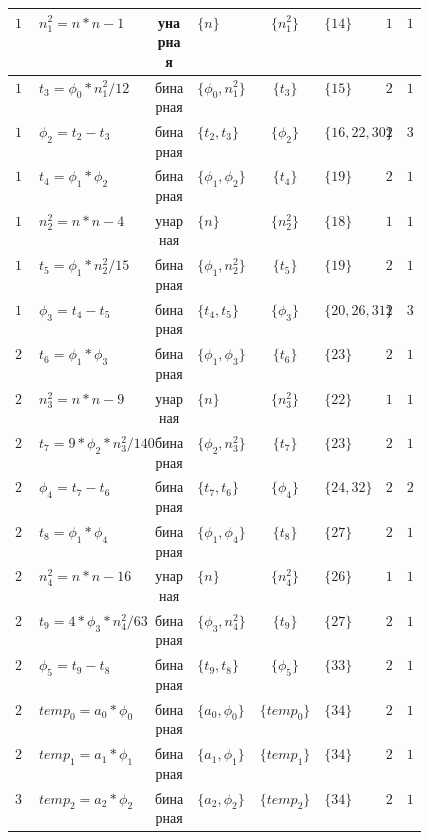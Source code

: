 \documentclass[a4paper,14pt]{article}
\begin{document}
\begin{tabular}{|c|p{0.16\linewidth}|c|p{0.14\linewidth}|c|p{0.1\linewidth}|p{0.05\linewidth}|p{0.025\linewidth}|}
$13$ &$n^2_{1} = n*n - 1$ &унарная &$\{n\}$ &$\{n^2_{1}\}$ &$\{14\}$ &$1$ &$1$ \\ \hline
$14$ &$t_{3} = \phi_{0} * n^2_{1} / 12$ &бинарная &$\{\phi_{0}, n^2_{1}\}$ &$\{t_{3}\}$ &$\{15\}$ &$2$ &$1$ \\ \hline
$15$ &$\phi_{2} = t_{2} - t_{3}$ &бинарная &$\{t_{2}, t_{3}\}$ &$\{\phi_{2}\}$ &$\{16, 22, 30\}$ &$2$ &$3$ \\ \hline
$16$ &$t_{4} = \phi_{1} * \phi_{2}$ &бинарная &$\{\phi_{1}, \phi_{2}\}$ &$\{t_{4}\}$ &$\{19\}$ &$2$ &$1$ \\ \hline
$17$ &$n^2_{2} = n*n - 4$ &унарная &$\{n\}$ &$\{n^2_{2}\}$ &$\{18\}$ &$1$ &$1$ \\ \hline
$18$ &$t_{5} = \phi_{1} * n^2_{2} / 15$ &бинарная &$\{\phi_{1}, n^2_{2}\}$ &$\{t_{5}\}$ &$\{19\}$ &$2$ &$1$ \\ \hline
$19$ &$\phi_{3} = t_{4} - t_{5}$ &бинарная &$\{t_{4}, t_{5}\}$ &$\{\phi_{3}\}$ &$\{20, 26, 31\}$ &$2$ &$3$ \\ \hline
$20$ &$t_{6} = \phi_{1} * \phi_{3}$ &бинарная &$\{\phi_{1}, \phi_{3}\}$ &$\{t_{6}\}$ &$\{23\}$ &$2$ &$1$ \\ \hline
$21$ &$n^2_{3} = n*n - 9$ &унарная &$\{n\}$ &$\{n^2_{3}\}$ &$\{22\}$ &$1$ &$1$ \\ \hline
$22$ &$t_{7} = 9 * \phi_{2} * n^2_{3} / 140$ &бинарная &$\{\phi_{2}, n^2_{3}\}$ &$\{t_{7}\}$ &$\{23\}$ &$2$ &$1$ \\ \hline
$23$ &$\phi_{4} = t_{7} - t_{6}$ &бинарная &$\{t_{7}, t_{6}\}$ &$\{\phi_{4}\}$ &$\{24, 32\}$ &$2$ &$2$ \\ \hline
$24$ &$t_{8} = \phi_{1} * \phi_{4}$ &бинарная &$\{\phi_{1}, \phi_{4}\}$ &$\{t_{8}\}$ &$\{27\}$ &$2$ &$1$ \\ \hline
$25$ &$n^2_{4} = n*n - 16$ &унарная &$\{n\}$ &$\{n^2_{4}\}$ &$\{26\}$ &$1$ &$1$ \\ \hline
$26$ &$t_{9} = 4 * \phi_{3} * n^2_{4} / 63$ &бинарная &$\{\phi_{3}, n^2_{4}\}$ &$\{t_{9}\}$ &$\{27\}$ &$2$ &$1$ \\ \hline
$27$ &$\phi_{5} = t_{9} - t_{8}$ &бинарная &$\{t_{9}, t_{8}\}$ &$\{\phi_{5}\}$ &$\{33\}$ &$2$ &$1$ \\ \hline
$28$ &$temp_{0} = a_{0} * \phi_{0}$ &бинарная &$\{a_{0}, \phi_{0}\}$ &$\{temp_{0}\}$ &$\{34\}$ &$2$ &$1$ \\ \hline
$29$ &$temp_{1} = a_{1} * \phi_{1}$ &бинарная &$\{a_{1}, \phi_{1}\}$ &$\{temp_{1}\}$ &$\{34\}$ &$2$ &$1$ \\ \hline
$30$ &$temp_{2} = a_{2} * \phi_{2}$ &бинарная &$\{a_{2}, \phi_{2}\}$ &$\{temp_{2}\}$ &$\{34\}$ &$2$ &$1$ \\ \hline

\end{tabular}
\end{document}
